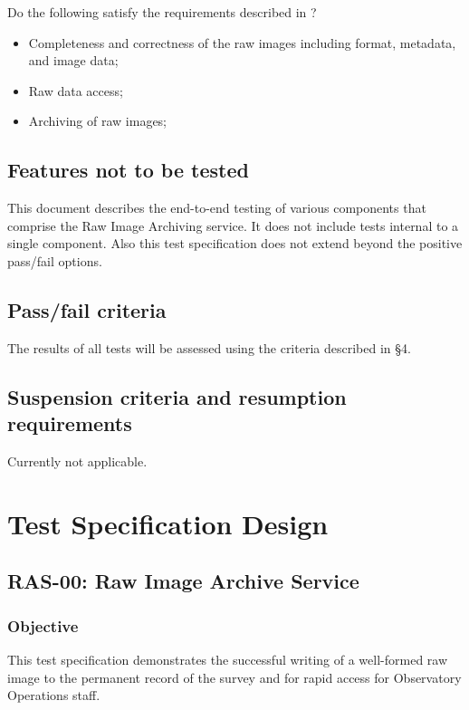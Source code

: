 \documentclass[DM,lsstdraft,STS,toc]{lsstdoc}
\begin{document}
Do the following satisfy the requirements described in ?
\begin{itemize}
\item{Completeness and correctness of the raw images including format, metadata, and image data;}
\item{Raw data access;}
\item{Archiving of raw images;}
\end{itemize}


\subsection{Features not to be tested}
\label{sec:featnot2test}


This document describes the end-to-end testing of various components
that comprise the Raw Image Archiving service. It does not include tests internal to
a single component. Also this test specification does not
extend beyond the positive pass/fail options.

\subsection{Pass/fail criteria}
\label{sec:passfail}


The results of all tests will be assessed using the criteria described in
 \S4.




\subsection{Suspension criteria and resumption requirements}
\label{suspension}

Currently not applicable.


\section{Test Specification Design}
\label{sec:Test Specification Design}
\subsection{RAS-00: Raw Image Archive Service}


\subsubsection{Objective}
This test specification demonstrates the successful writing of a
well-formed raw image to the permanent record of the survey and
for rapid access for Observatory Operations staff.
\end{document}
